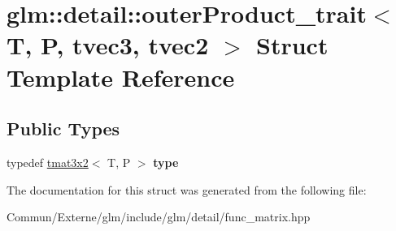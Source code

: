 \hypertarget{structglm_1_1detail_1_1outer_product__trait_3_01_t_00_01_p_00_01tvec3_00_01tvec2_01_4}{}\section{glm\+:\+:detail\+:\+:outer\+Product\+\_\+trait$<$ T, P, tvec3, tvec2 $>$ Struct Template Reference}
\label{structglm_1_1detail_1_1outer_product__trait_3_01_t_00_01_p_00_01tvec3_00_01tvec2_01_4}
\subsection*{Public Types}
\begin{DoxyCompactItemize}
\item 
typedef \hyperlink{structglm_1_1detail_1_1tmat3x2}{tmat3x2}$<$ T, P $>$ {\bfseries type}\hypertarget{structglm_1_1detail_1_1outer_product__trait_3_01_t_00_01_p_00_01tvec3_00_01tvec2_01_4_a241608939fa083f2ddb7c701be75a732}{}\label{structglm_1_1detail_1_1outer_product__trait_3_01_t_00_01_p_00_01tvec3_00_01tvec2_01_4_a241608939fa083f2ddb7c701be75a732}

\end{DoxyCompactItemize}


The documentation for this struct was generated from the following file\+:\begin{DoxyCompactItemize}
\item 
Commun/\+Externe/glm/include/glm/detail/func\+\_\+matrix.\+hpp\end{DoxyCompactItemize}

